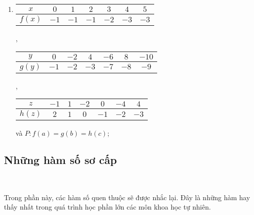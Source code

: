 \begin{enumerate}
   \item
   \begin{tabular}{|c|c|c|c|c|c|c|}
      \hline
      $x$ & $0$ & $1$ & $2$ & $3$ & $4$ & $5$ \\
      \hline
      $f(x)$ & $-1$ & $-1$ & $-1$ & $-2$ & $-3$ & $-3$\\
      \hline
   \end{tabular},
   \begin{tabular}{|c|c|c|c|c|c|c|}
      \hline
      $y$ & $0$ & $-2$ & $4$ & $-6$ & $8$ & $-10$\\
      \hline
      $g(y)$ & $-1$ & $-2$ & $-3$ & $-7$ & $-8$ & $-9$\\
      \hline
   \end{tabular},

   \noindent\begin{tabular}{|c|c|c|c|c|c|c|}
      \hline
      $z$ & $-1$ & $1$ & $-2$ & $0$ & $-4$ & $4$\\
      \hline
      $h(z)$ & $2$ & $1$ & $0$ & $-1$ & $-2$ & $-3$\\
      \hline
   \end{tabular} và $P:f(a) = g(b) = h(c)$;
\end{enumerate}

\solution[ex:hpt1]

\subsection{Những hàm số sơ cấp}

\ %

Trong phần này, các hàm số quen thuộc sẽ được nhắc lại. Đây là những hàm hay thấy nhất trong quá trình học phần lớn các môn khoa học tự nhiên.

